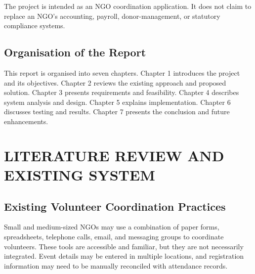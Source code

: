 \documentclass[12pt,a4paper,oneside]{report}
\begin{document}
The project is intended as an NGO coordination application. It does not claim to replace an NGO's accounting, payroll, donor-management, or statutory compliance systems.

\section{Organisation of the Report}
This report is organised into seven chapters. Chapter 1 introduces the project and its objectives. Chapter 2 reviews the existing approach and proposed solution. Chapter 3 presents requirements and feasibility. Chapter 4 describes system analysis and design. Chapter 5 explains implementation. Chapter 6 discusses testing and results. Chapter 7 presents the conclusion and future enhancements.

\chapter{LITERATURE REVIEW AND EXISTING SYSTEM}

\section{Existing Volunteer Coordination Practices}
Small and medium-sized NGOs may use a combination of paper forms, spreadsheets, telephone calls, email, and messaging groups to coordinate volunteers. These tools are accessible and familiar, but they are not necessarily integrated. Event details may be entered in multiple locations, and registration information may need to be manually reconciled with attendance records.
\end{document}
